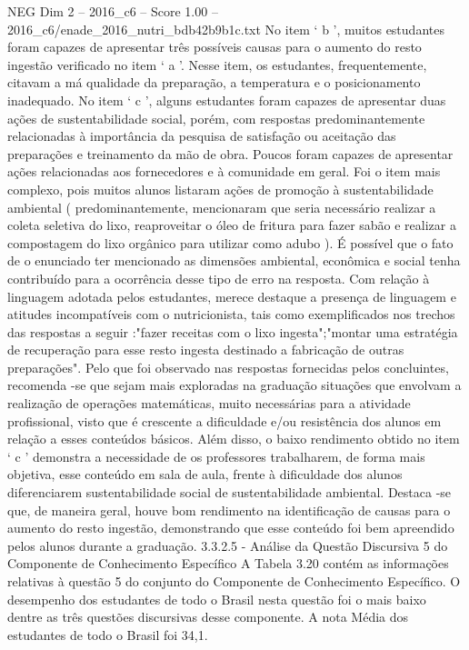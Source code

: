 \begin{textsample}{NEG Dim 2 – 2016\_c6 – Score 1.00 – 2016\_c6/enade\_2016\_nutri\_bdb42b9b1c.txt}
No item ‘ b ’, muitos estudantes foram capazes de apresentar três possíveis causas para o aumento do resto ingestão verificado no item ‘ a ’.
Nesse item, os estudantes, frequentemente, citavam a má qualidade da preparação, a temperatura e o posicionamento inadequado.
No item ‘ c ’, alguns estudantes foram capazes de apresentar duas ações de sustentabilidade social, porém, com respostas predominantemente relacionadas à importância da pesquisa de satisfação ou aceitação das preparações e treinamento da mão de obra.
Poucos foram capazes de apresentar ações relacionadas aos fornecedores e à comunidade em geral.
Foi o item mais complexo, pois muitos alunos listaram ações de promoção à sustentabilidade ambiental ( predominantemente, mencionaram que seria necessário realizar a coleta seletiva do lixo, reaproveitar o óleo de fritura para fazer sabão e realizar a compostagem do lixo orgânico para utilizar como adubo ).
É possível que o fato de o enunciado ter mencionado as dimensões ambiental, econômica e social tenha contribuído para a ocorrência desse tipo de erro na resposta.
Com relação à linguagem adotada pelos estudantes, merece destaque a presença de linguagem e atitudes incompatíveis com o nutricionista, tais como exemplificados nos trechos das respostas a seguir :"fazer receitas com o lixo ingesta";"montar uma estratégia de recuperação para esse resto ingesta destinado a fabricação de outras preparações".
Pelo que foi observado nas respostas fornecidas pelos concluintes, recomenda -se que sejam mais exploradas na graduação situações que envolvam a realização de operações matemáticas, muito necessárias para a atividade profissional, visto que é crescente a dificuldade e/ou resistência dos alunos em relação a esses conteúdos básicos.
Além disso, o baixo rendimento obtido no item ‘ c ’ demonstra a necessidade de os professores trabalharem, de forma mais objetiva, esse conteúdo em sala de aula, frente à dificuldade dos alunos diferenciarem sustentabilidade social de sustentabilidade ambiental.
Destaca -se que, de maneira geral, houve bom rendimento na identificação de causas para o aumento do resto ingestão, demonstrando que esse conteúdo foi bem apreendido pelos alunos durante a graduação. 3.3.2.5 - Análise da Questão Discursiva 5 do Componente de Conhecimento Específico A Tabela 3.20 contém as informações relativas à questão 5 do conjunto do Componente de Conhecimento Específico.
O desempenho dos estudantes de todo o Brasil nesta questão foi o mais baixo dentre as três questões discursivas desse componente.
A nota Média dos estudantes de todo o Brasil foi 34,1.

\end{textsample}
